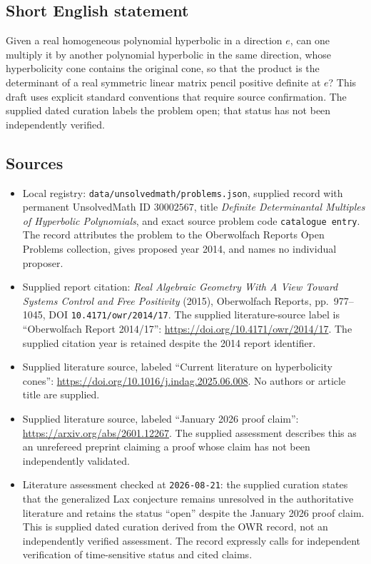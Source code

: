 \documentclass[11pt]{article}
\begin{document}
\subsection{Short English statement}
Given a real homogeneous polynomial hyperbolic in a direction \(e\), can one multiply it by another polynomial hyperbolic in the same direction, whose hyperbolicity cone contains the original cone, so that the product is the determinant of a real symmetric linear matrix pencil positive definite at \(e\)? This draft uses explicit standard conventions that require source confirmation. The supplied dated curation labels the problem open; that status has not been independently verified.
\subsection{Sources}
\begin{itemize}
\item Local registry: \texttt{data/unsolvedmath/problems.json}, supplied record with permanent UnsolvedMath ID \(30002567\), title \emph{Definite Determinantal Multiples of Hyperbolic Polynomials}, and exact source problem code \texttt{catalogue entry}. The record attributes the problem to the Oberwolfach Reports Open Problems collection, gives proposed year 2014, and names no individual proposer.
\item Supplied report citation: \emph{Real Algebraic Geometry With A View Toward Systems Control and Free Positivity} (2015), Oberwolfach Reports, pp.\ 977--1045, DOI \texttt{10.4171/owr/2014/17}. The supplied literature-source label is ``Oberwolfach Report 2014/17'': \url{https://doi.org/10.4171/owr/2014/17}. The supplied citation year is retained despite the 2014 report identifier.
\item Supplied literature source, labeled ``Current literature on hyperbolicity cones'': \url{https://doi.org/10.1016/j.indag.2025.06.008}. No authors or article title are supplied.
\item Supplied literature source, labeled ``January 2026 proof claim'': \url{https://arxiv.org/abs/2601.12267}. The supplied assessment describes this as an unrefereed preprint claiming a proof whose claim has not been independently validated.
\item Literature assessment checked at \texttt{2026-08-21}: the supplied curation states that the generalized Lax conjecture remains unresolved in the authoritative literature and retains the status ``open'' despite the January 2026 proof claim. This is supplied dated curation derived from the OWR record, not an independently verified assessment. The record expressly calls for independent verification of time-sensitive status and cited claims.
\end{itemize}
\end{document}
